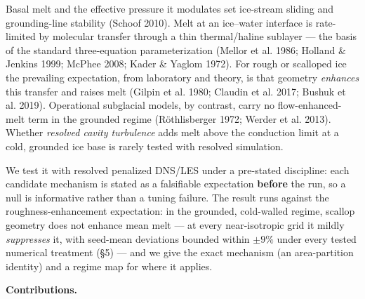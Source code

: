 \documentclass[tc, manuscript]{copernicus}
\begin{document}
\begin{abstract}
single seeds graze unity, so we do not certify the sign in the continuum limit either — the strongest resolution-robust quantitative statement is $|Nu/Nu_{flat}-1| \le  9\%$ in the seed mean ($\le  11\%$ for any single seed) at every grid tested, i.e. \textbf{no large roughness melt enhancement} in this regime. We therefore claim only the resolution-robust results: the bounded-deviation ceiling and the \emph{exact} area-partition identity, which holds to machine precision at every resolution. In this regime, scallop geometry does not enhance — and at every near-isotropic grid slightly suppresses — mean basal melt.
\end{abstract}

\introduction

Basal melt and the effective pressure it modulates set ice-stream sliding and grounding-line stability (Schoof 2010). Melt at an ice–water interface is rate-limited by molecular transfer through a thin thermal/haline sublayer — the basis of the standard three-equation parameterization (Mellor et al. 1986; Holland \& Jenkins 1999; McPhee 2008; Kader \& Yaglom 1972). For rough or scalloped ice the prevailing expectation, from laboratory and theory, is that geometry \emph{enhances} this transfer and raises melt (Gilpin et al. 1980; Claudin et al. 2017; Bushuk et al. 2019). Operational subglacial models, by contrast, carry no flow-enhanced-melt term in the grounded regime (Röthlisberger 1972; Werder et al. 2013). Whether \emph{resolved cavity turbulence} adds melt above the conduction limit at a cold, grounded ice base is rarely tested with resolved simulation.

We test it with resolved penalized DNS/LES under a pre-stated discipline: each candidate mechanism is stated as a falsifiable expectation \textbf{before} the run, so a null is informative rather than a tuning failure. The result runs against the roughness-enhancement expectation: in the grounded, cold-walled regime, scallop geometry does not enhance mean melt — at every near-isotropic grid it mildly \emph{suppresses} it, with seed-mean deviations bounded within $\pm 9\%$ under every tested numerical treatment (§5) — and we give the exact mechanism (an area-partition identity) and a regime map for where it applies.

\textbf{Contributions.}
\end{document}
